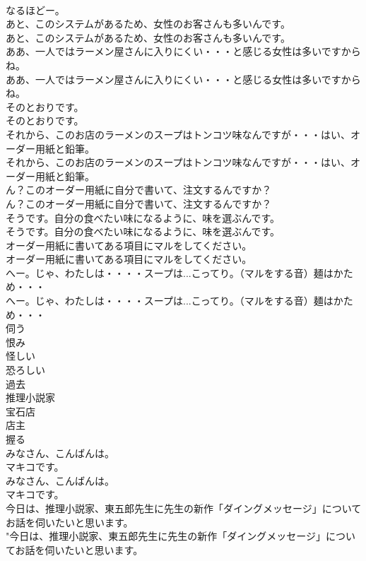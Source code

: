 \documentclass[8pt]{extreport}
\begin{document}
\begin{CJK}{UTF8}{min}
\\	なるほどー。 
\\	あと、このシステムがあるため、女性のお客さんも多いんです。	
\\	あと、このシステムがあるため、女性のお客さんも多いんです。 
\\	ああ、一人ではラーメン屋さんに入りにくい・・・と感じる女性は多いですからね。	
\\	ああ、一人ではラーメン屋さんに入りにくい・・・と感じる女性は多いですからね。 
\\	そのとおりです。	
\\	そのとおりです。 
\\	それから、このお店のラーメンのスープはトンコツ味なんですが・・・はい、オーダー用紙と鉛筆。	
\\	それから、このお店のラーメンのスープはトンコツ味なんですが・・・はい、オーダー用紙と鉛筆。 
\\	ん？このオーダー用紙に自分で書いて、注文するんですか？	
\\	ん？このオーダー用紙に自分で書いて、注文するんですか？ 
\\	そうです。自分の食べたい味になるように、味を選ぶんです。	
\\	そうです。自分の食べたい味になるように、味を選ぶんです。 
\\	オーダー用紙に書いてある項目にマルをしてください。	
\\	オーダー用紙に書いてある項目にマルをしてください。 
\\	へー。じゃ、わたしは・・・・スープは...こってり。（マルをする音）麺はかため・・・	
\\	へー。じゃ、わたしは・・・・スープは...こってり。（マルをする音）麺はかため・・・ 
\\	伺う
\\	恨み
\\	怪しい
\\	恐ろしい
\\	過去
\\	推理小説家
\\	宝石店
\\	店主
\\	握る
\\	みなさん、こんばんは。
\\	マキコです。	
\\	みなさん、こんばんは。
\\	マキコです。 
\\	今日は、推理小説家、東五郎先生に先生の新作「ダイングメッセージ」についてお話を伺いたいと思います。	
\\	"今日は、推理小説家、東五郎先生に先生の新作「ダイングメッセージ」についてお話を伺いたいと思います。 

\end{CJK}
\end{document}
